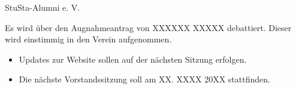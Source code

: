 \documentclass[a4paper,12pt]{article}
\begin{document}
\begin{Protokoll}{StuSta-Alumni e. V.}


\protokollKopf
\newpage

Es wird über den Augnahmeantrag von XXXXXX XXXXX debattiert. Dieser wird einstimmig in den Verein aufgenommen.

\begin{itemize}
  \item Updates zur Website sollen auf der nächsten Sitzung erfolgen.
  \item Die nächste Vorstandssitzung soll am XX. XXXX 20XX stattfinden.
\end{itemize}


\end{Protokoll}
\end{document}
